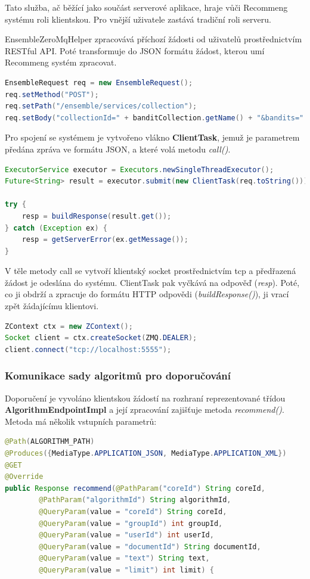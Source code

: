 \documentclass[thesis=M,czech]{FITthesis}[2014/05/07]
\begin{document}
Tato služba, ač běžící jako součást serverové aplikace, hraje vůči Recommeng systému roli klientskou. Pro vnější uživatele zastává tradiční roli serveru.

EnsembleZeroMqHelper zpracovává příchozí žádosti od uživatelů prostřednictvím RESTful API. Poté transformuje do JSON formátu žádost, kterou umí Recommeng systém zpracovat. 

\begin{lstlisting}[language=java]
EnsembleRequest req = new EnsembleRequest();
req.setMethod("POST");
req.setPath("/ensemble/services/collection");
req.setBody("collectionId=" + banditCollection.getName() + "&bandits=" + formatBanditIds(banditCollection.getBanditIds()));
\end{lstlisting}

Pro spojení se systémem je vytvořeno vlákno \textbf{ClientTask}, jemuž je parametrem předána zpráva ve formátu JSON, a které volá metodu \emph{call()}.

\begin{lstlisting}[language=java]
ExecutorService executor = Executors.newSingleThreadExecutor();
Future<String> result = executor.submit(new ClientTask(req.toString()));

try {
    resp = buildResponse(result.get());
} catch (Exception ex) {
    resp = getServerError(ex.getMessage());
}
\end{lstlisting}

V těle metody call se vytvoří klientský socket prostřednictvím tcp a předřazená žádost je odeslána do systému. ClientTask pak vyčkává na odpověď (\emph{resp}). Poté, co ji obdrží a zpracuje do formátu HTTP odpovědi (\emph{buildResponse()}), ji vrací zpět žádajícímu klientovi. 

\begin{lstlisting}[language=java]
ZContext ctx = new ZContext();
Socket client = ctx.createSocket(ZMQ.DEALER);
client.connect("tcp://localhost:5555");
\end{lstlisting}

\subsubsection{Komunikace sady algoritmů pro doporučování}
\label{sec:algcom}
Doporučení je vyvoláno klientskou žádostí na rozhraní reprezentované třídou \textbf{AlgorithmEndpointImpl} a její zpracování zajišťuje metoda \emph{recommend()}. Metoda má několik vstupních parametrů:

\begin{lstlisting}[language=java]
@Path(ALGORITHM_PATH)
@Produces({MediaType.APPLICATION_JSON, MediaType.APPLICATION_XML})
@GET
@Override
public Response recommend(@PathParam("coreId") String coreId,
        @PathParam("algorithmId") String algorithmId,
        @QueryParam(value = "coreId") String coreId,
        @QueryParam(value = "groupId") int groupId,
        @QueryParam(value = "userId") int userId,
        @QueryParam(value = "documentId") String documentId,
        @QueryParam(value = "text") String text,
        @QueryParam(value = "limit") int limit) {
\end{lstlisting}
\end{document}
